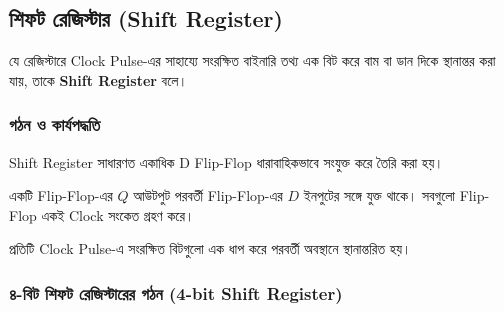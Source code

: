 \subsection{শিফট রেজিস্টার
(\textenglish{Shift Register})}

যে রেজিস্টারে \textenglish{Clock Pulse}-এর সাহায্যে সংরক্ষিত বাইনারি তথ্য
এক বিট করে বাম বা ডান দিকে স্থানান্তর করা যায়,
তাকে \textbf{\textenglish{Shift Register}} বলে।

\subsubsection*{গঠন ও কার্যপদ্ধতি}

\textenglish{Shift Register} সাধারণত একাধিক
\textenglish{D Flip-Flop} ধারাবাহিকভাবে সংযুক্ত করে তৈরি করা হয়।

একটি \textenglish{Flip-Flop}-এর \(Q\) আউটপুট পরবর্তী
\textenglish{Flip-Flop}-এর \(D\) ইনপুটের সঙ্গে যুক্ত থাকে।
সবগুলো \textenglish{Flip-Flop} একই \textenglish{Clock} সংকেত গ্রহণ করে।

প্রতিটি \textenglish{Clock Pulse}-এ সংরক্ষিত বিটগুলো এক ধাপ করে
পরবর্তী অবস্থানে স্থানান্তরিত হয়।



\subsubsection*{৪-বিট শিফট রেজিস্টারের গঠন
(\textenglish{4-bit Shift Register})}

